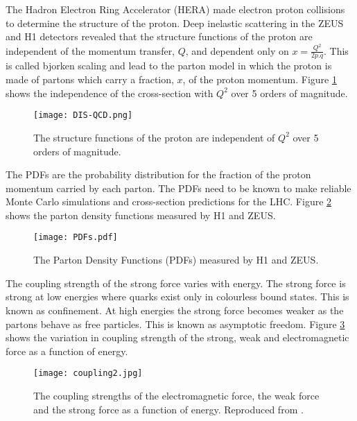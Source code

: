 The Hadron Electron Ring Accelerator (HERA) made electron proton collisions to
determine the structure of the proton. Deep inelastic scattering in the ZEUS and
H1 detectors revealed that the structure functions of the proton are independent
of the momentum transfer, $Q$, and dependent only on $x = \frac{Q^{2}}{2p.q}$. 
This is called bjorken scaling and lead to the parton model in which the proton 
is made of partons which carry a fraction, $x$, of the proton momentum. Figure 
\ref{fig:dis} shows the independence of the cross-section with $Q^{2}$ over 5 
orders of magnitude. \\

\begin{figure}
\begin{center}
\texttt{[image: DIS-QCD.png]}
\end{center}
\caption{The structure functions of the proton are independent of $Q^{2}$ over 5
orders of magnitude.}
\label{fig:dis}
\end{figure}

The PDFs are the probability distribution for the fraction of the proton 
momentum carried by each parton. The PDFs need to be known to make reliable 
Monte Carlo simulations and cross-section predictions for the LHC. Figure 
\ref{fig:pdfs} shows the parton density functions measured by H1 and ZEUS. \\

\begin{figure}
\begin{center}
\texttt{[image: PDFs.pdf]}
\end{center}
\caption{The Parton Density Functions (PDFs) measured by H1 and ZEUS.}
\label{fig:pdfs}
\end{figure}

The coupling strength of the strong force varies with energy. The strong force 
is strong at low energies where quarks exist only in colourless bound states. 
This is known as confinement. At high energies the strong force becomes weaker 
as the partons behave as free particles. This is known as asymptotic freedom. 
Figure \ref{fig:coupling} shows the variation in coupling strength of the 
strong, weak and electromagnetic force as a function of energy.

\begin{figure}
\begin{center}
\texttt{[image: coupling2.jpg]}
\end{center}
\caption{The coupling strengths of the electromagnetic force, the weak force and
the strong force as a function of energy. Reproduced from \cite{nobel_2004}.}
\label{fig:coupling}
\end{figure}

